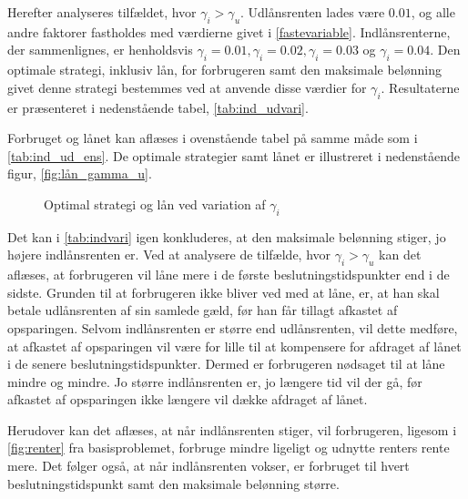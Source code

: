 Herefter analyseres tilfældet, hvor $\gamma_i > \gamma_u$. Udlånsrenten lades være $0.01$, og alle andre faktorer fastholdes med værdierne givet i \eqref{fastevariable}. Indlånsrenterne, der sammenlignes, er henholdsvis $\gamma_i = 0.01,  \gamma_i = 0.02,  \gamma_i = 0.03$ og $ \gamma_i = 0.04$. Den optimale strategi, inklusiv lån, for forbrugeren samt den maksimale belønning givet denne strategi bestemmes ved at anvende disse værdier for $\gamma_i$. Resultaterne er præsenteret i nedenstående tabel, \autoref{tab:ind_udvari}.



Forbruget og lånet kan aflæses i ovenstående tabel på samme måde som i \autoref{tab:ind_ud_ens}. De optimale strategier samt lånet er illustreret i nedenstående figur, \autoref{fig:lån_gamma_u}. 

\begin{figure}[H]
    \begin{center}
        \resizebox{8cm}{!}{}
        \resizebox{8cm}{!}{}
    \end{center}
    \caption{Optimal strategi og lån ved variation af $\gamma_i$ }\label{fig:lån_gamma_i}
\end{figure}

Det kan i \autoref{tab:indvari} igen konkluderes, at den maksimale belønning stiger, jo højere indlånsrenten er. Ved at analysere de tilfælde, hvor $\gamma_i > \gamma_u$ kan det aflæses, at forbrugeren vil låne mere i de første beslutningstidspunkter end i de sidste. Grunden til at forbrugeren ikke bliver ved med at låne, er, at han skal betale udlånsrenten af sin samlede gæld, før han får tillagt afkastet af opsparingen. Selvom indlånsrenten er større end udlånsrenten, vil dette medføre, at afkastet af opsparingen vil være for lille til at kompensere for afdraget af lånet i de senere beslutningstidspunkter. Dermed er forbrugeren nødsaget til at låne mindre og mindre. Jo større indlånsrenten er, jo længere tid vil der gå, før afkastet af opsparingen ikke længere vil dække afdraget af lånet. 

Herudover kan det aflæses, at når indlånsrenten stiger, vil forbrugeren, ligesom i \autoref{fig:renter} fra basisproblemet, forbruge mindre ligeligt og udnytte renters rente mere. Det følger også, at når indlånsrenten vokser, er forbruget til hvert beslutningstidspunkt samt den maksimale belønning større. 



